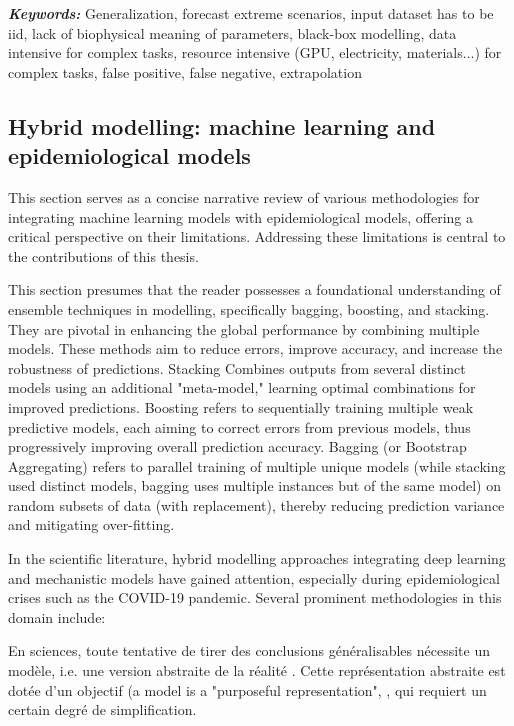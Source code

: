 \textit{\textbf{Keywords:}} Generalization, forecast extreme scenarios, input dataset has to be iid, lack of biophysical meaning of parameters, black-box modelling, data intensive for complex tasks, resource intensive (GPU, electricity, materials...) for complex tasks, false positive, false negative, extrapolation


\subsection{Hybrid modelling: machine learning and epidemiological models}

This section serves as a concise narrative review of various methodologies for integrating machine learning models with epidemiological models, offering a critical perspective on their limitations. Addressing these limitations is central to the contributions of this thesis.

This section presumes that the reader possesses a foundational understanding of ensemble techniques in modelling, specifically bagging, boosting, and stacking. They are pivotal in enhancing the global performance by combining multiple models. These methods aim to reduce errors, improve accuracy, and increase the robustness of predictions. Stacking Combines outputs from several distinct models using an additional "meta-model," learning optimal combinations for improved predictions. Boosting refers to sequentially training multiple weak predictive models, each aiming to correct errors from previous models, thus progressively improving overall prediction accuracy. Bagging (or Bootstrap Aggregating) refers to parallel training of multiple unique models (while stacking used distinct models, bagging uses multiple instances but of the same model) on random subsets of data (with replacement), thereby reducing prediction variance and mitigating over-fitting.

In the scientific literature, hybrid modelling approaches integrating deep learning and mechanistic models have gained attention, especially during epidemiological crises such as the COVID-19 pandemic. Several prominent methodologies in this domain include:

En sciences, toute tentative de tirer des conclusions généralisables nécessite un
modèle, i.e. une version abstraite de la réalité \cite{McCallum2008}. Cette représentation
abstraite est dotée d’un objectif (a model is a "purposeful representation", 
\cite{Starfield1990}, qui requiert un certain degré de simplification.

